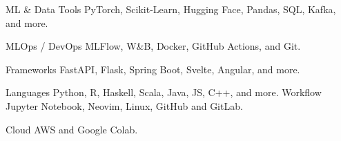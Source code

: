 

\begin{cvskills}

\cvskill
  {ML \& Data Tools}
  {PyTorch, Scikit-Learn, Hugging Face, Pandas, SQL, Kafka, and more.}

\cvskill
  {MLOps / DevOps} {MLFlow, W\&B, Docker, GitHub Actions, and Git.}

\cvskill
  {Frameworks}
  {FastAPI, Flask, Spring Boot, Svelte, Angular, and more.}

\cvskill
  {Languages}
  {Python, R, Haskell, Scala, Java, JS, C++, and more.}
\cvskill
  {Workflow}
  {Jupyter Notebook, Neovim, Linux, GitHub and GitLab.}

\cvskill
  {Cloud}
  {AWS and Google Colab.}

\end{cvskills}
